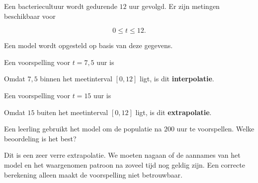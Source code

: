 \documentclass{ximera}
\begin{document}

\begin{oefening}{\oefB \ESS}

Een bacteriecultuur wordt gedurende $12$ uur gevolgd.
Er zijn metingen beschikbaar voor

\[
0\leq t\leq12.
\]

Een model wordt opgesteld op basis van deze gegevens.

\begin{question}
Een voorspelling voor $t=7{,}5$ uur is

\begin{multipleChoice}
\end{multipleChoice}


\begin{oplossing}
Omdat $7{,}5$ binnen het meetinterval $[0,12]$ ligt, is dit
\textbf{interpolatie}.
\end{oplossing}

\end{question}

\begin{question}
Een voorspelling voor $t=15$ uur is

\begin{multipleChoice}
\end{multipleChoice}


\begin{oplossing}
Omdat $15$ buiten het meetinterval $[0,12]$ ligt, is dit
\textbf{extrapolatie}.
\end{oplossing}

\end{question}

\begin{question}
Een leerling gebruikt het model om de populatie na $200$ uur te voorspellen.
Welke beoordeling is het best?

\begin{multipleChoice}
\end{multipleChoice}


\begin{oplossing}
Dit is een zeer verre extrapolatie. We moeten nagaan of de aannames
van het model en het waargenomen patroon na zoveel tijd nog geldig zijn.
Een correcte berekening alleen maakt de voorspelling niet betrouwbaar.
\end{oplossing}

\end{question}

\end{oefening}
\end{document}
